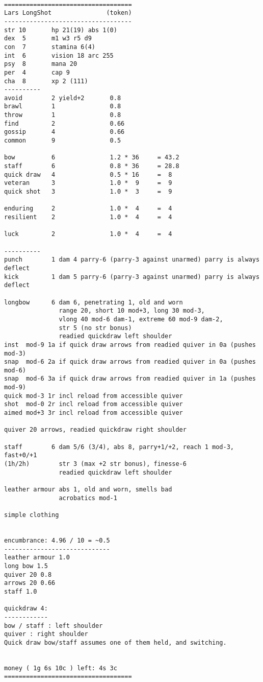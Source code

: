 \

\pagebreak[1]
\tiny \begin{samepage} \begin{verbatim}
===================================
Lars LongShot               (token)
-----------------------------------
str 10       hp 21(19) abs 1(0)
dex  5       m1 w3 r5 d9
con  7       stamina 6(4)
int  6       vision 18 arc 255
psy  8       mana 20
per  4       cap 9
cha  8       xp 2 (111)
----------
avoid        2 yield+2       0.8
brawl        1               0.8
throw        1               0.8
find         2               0.66
gossip       4               0.66
common       9               0.5

bow          6               1.2 * 36     = 43.2
staff        6               0.8 * 36     = 28.8
quick draw   4               0.5 * 16     =  8
veteran      3               1.0 *  9     =  9
quick shot   3               1.0 *  3     =  9

enduring     2               1.0 *  4     =  4
resilient    2               1.0 *  4     =  4

luck         2               1.0 *  4     =  4

----------
punch        1 dam 4 parry-6 (parry-3 against unarmed) parry is always deflect
kick         1 dam 5 parry-6 (parry-3 against unarmed) parry is always deflect

longbow      6 dam 6, penetrating 1, old and worn
               range 20, short 10 mod+3, long 30 mod-3,
               vlong 40 mod-6 dam-1, extreme 60 mod-9 dam-2,
               str 5 (no str bonus)
               readied quickdraw left shoulder
inst  mod-9 1a if quick draw arrows from readied quiver in 0a (pushes mod-3)
snap  mod-6 2a if quick draw arrows from readied quiver in 0a (pushes mod-6)
snap  mod-6 3a if quick draw arrows from readied quiver in 1a (pushes mod-9)
quick mod-3 1r incl reload from accessible quiver
shot  mod-0 2r incl reload from accessible quiver
aimed mod+3 3r incl reload from accessible quiver

quiver 20 arrows, readied quickdraw right shoulder

staff        6 dam 5/6 (3/4), abs 8, parry+1/+2, reach 1 mod-3, fast+0/+1
(1h/2h)        str 3 (max +2 str bonus), finesse-6
               readied quickdraw left shoulder

leather armour abs 1, old and worn, smells bad
               acrobatics mod-1

simple clothing


encumbrance: 4.96 / 10 = ~0.5
-----------------------------
leather armour 1.0
long bow 1.5
quiver 20 0.8
arrows 20 0.66
staff 1.0

quickdraw 4:
------------
bow / staff : left shoulder
quiver : right shoulder
Quick draw bow/staff assumes one of them held, and switching.


money ( 1g 6s 10c ) left: 4s 3c
===================================
\end{verbatim} \end{samepage} \normalsize


